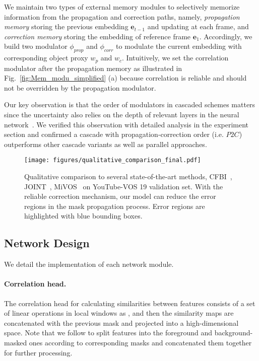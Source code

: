 \documentclass[letterpaper]{article} \usepackage{aaai22}  \usepackage{times}  \usepackage{helvet}  \usepackage{courier}  \usepackage[hyphens]{url}  \usepackage{graphicx} \urlstyle{rm} \def\UrlFont{\rm}  \usepackage{natbib}  \usepackage{caption} \DeclareCaptionStyle{ruled}{labelfont=normalfont,labelsep=colon,strut=off} \frenchspacing  \setlength{\pdfpagewidth}{8.5in}  \setlength{\pdfpageheight}{11in}  \usepackage{algorithm}
\newcommand{\fig}[1]{Fig.~#1}
\begin{document}
We maintain two types of external memory modules to selectively memorize information from the propagation and correction paths, namely, \textit{propagation memory} storing the previous embedding $\mathbf{e}_{t-1}$ and updating at each frame, and \textit{correction memory} storing the embedding of reference frame $\mathbf{e}_{1}$.
Accordingly, we build two modulator $\phi_{prop}$ and $\phi_{corr}$ to modulate the current embedding with corresponding object proxy $w_{p}$ and $w_c$.
Intuitively, we set the correlation modulator after the propagation memory as illustrated in \fig{\ref{fig:Mem_modu_simplified}} (a) because correlation is reliable and should not be overridden by the propagation modulator.

Our key observation is that the order of modulators in cascaded schemes matters since the uncertainty also relies on the depth of relevant layers in the neural network~\cite{goldfeld2019estimating}.
We verified this observation with detailed analysis in the experiment section and confirmed a cascade with propagation-correction order (i.e. $P2C$) outperforms other cascade variants as well as parallel approaches.
\begin{figure*}[ht!]
	\centering
	\texttt{[image: figures/qualitative\_comparison\_final.pdf]}
\caption{Qualitative comparison to several state-of-the-art methods, CFBI~\cite{yang2020collaborative}, JOINT~\cite{mao2021joint}, MiVOS~\cite{cheng2021mivos} on YouTube-VOS 19 validation set. With the reliable correction mechanism, our model can reduce the error regions in the mask propagation process. Error regions are highlighted with blue bounding boxes.}
	\label{fig:qualitative_comparison}
\end{figure*} \subsection{Network Design}
We detail the implementation of each network module.
\paragraph{Correlation head.}
The correlation head for calculating similarities between features consists of a set of linear operations in local windows as \cite{voigtlaender2019feelvos}, and then the similarity maps are concatenated with the previous mask and projected into a high-dimensional space. Note that we follow \cite{yang2020collaborative} to split features into the foreground and background-masked ones according to corresponding masks and concatenated them together for further processing.
\end{document}
